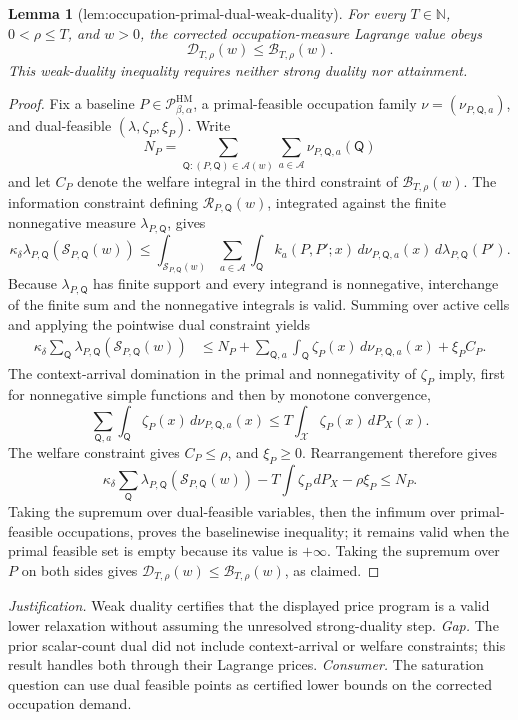 \documentclass{article}
\newtheorem{lemma}{Lemma}
\begin{document}
\begin{lemma}[lem:occupation-primal-dual-weak-duality]\label{lem:occupation-primal-dual-weak-duality}
For every \(T\in\mathbb N\), \(0<\rho\le T\), and \(w>0\), the corrected occupation-measure Lagrange value obeys
\[
\mathcal D_{T,\rho}(w)\le\mathcal B_{T,\rho}(w).
\]
This weak-duality inequality requires neither strong duality nor attainment.
\end{lemma}
\begin{proof}
Fix a baseline \(P\in\mathcal P_{\beta,\alpha}^{\mathrm{HM}}\), a primal-feasible occupation family \(\nu=(\nu_{P,\mathsf Q,a})\), and dual-feasible \((\lambda,\zeta_P,\xi_P)\).  Write
\[
N_P=\sum_{\mathsf Q:(P,\mathsf Q)\in\mathscr A(w)}
\sum_{a\in\mathcal A}\nu_{P,\mathsf Q,a}(\mathsf Q)
\]
and let \(C_P\) denote the welfare integral in the third constraint of \(\mathcal B_{T,\rho}(w)\).  The information constraint defining \(\mathcal R_{P,\mathsf Q}(w)\), integrated against the finite nonnegative measure \(\lambda_{P,\mathsf Q}\), gives
\[
\kappa_\delta\lambda_{P,\mathsf Q}(\mathcal S_{P,\mathsf Q}(w))
\le
\int_{\mathcal S_{P,\mathsf Q}(w)}
\sum_{a\in\mathcal A}\int_{\mathsf Q}k_a(P,P';x)
\,d\nu_{P,\mathsf Q,a}(x)\,d\lambda_{P,\mathsf Q}(P').
\]
Because \(\lambda_{P,\mathsf Q}\) has finite support and every integrand is nonnegative, interchange of the finite sum and the nonnegative integrals is valid.  Summing over active cells and applying the pointwise dual constraint yields
\[
\begin{split}
\kappa_\delta\sum_{\mathsf Q}
\lambda_{P,\mathsf Q}(\mathcal S_{P,\mathsf Q}(w))
&\le N_P
+\sum_{\mathsf Q,a}\int_{\mathsf Q}\zeta_P(x)
\,d\nu_{P,\mathsf Q,a}(x)+\xi_PC_P.
\end{split}
\]
The context-arrival domination in the primal and nonnegativity of \(\zeta_P\) imply, first for nonnegative simple functions and then by monotone convergence,
\[
\sum_{\mathsf Q,a}\int_{\mathsf Q}\zeta_P(x)
\,d\nu_{P,\mathsf Q,a}(x)
\le T\int_{\mathcal X}\zeta_P(x)\,dP_X(x).
\]
The welfare constraint gives \(C_P\le\rho\), and \(\xi_P\ge0\).  Rearrangement therefore gives
\[
\kappa_\delta\sum_{\mathsf Q}
\lambda_{P,\mathsf Q}(\mathcal S_{P,\mathsf Q}(w))
-T\int\zeta_P\,dP_X-\rho\xi_P\le N_P.
\]
Taking the supremum over dual-feasible variables, then the infimum over primal-feasible occupations, proves the baselinewise inequality; it remains valid when the primal feasible set is empty because its value is \(+\infty\).  Taking the supremum over \(P\) on both sides gives \(\mathcal D_{T,\rho}(w)\le\mathcal B_{T,\rho}(w)\), as claimed.
\end{proof}
\par\smallskip\noindent \textit{Justification.} Weak duality certifies that the displayed price program is a valid lower relaxation without assuming the unresolved strong-duality step. \textit{Gap.} The prior scalar-count dual did not include context-arrival or welfare constraints; this result handles both through their Lagrange prices. \textit{Consumer.} The saturation question can use dual feasible points as certified lower bounds on the corrected occupation demand.
\end{document}
